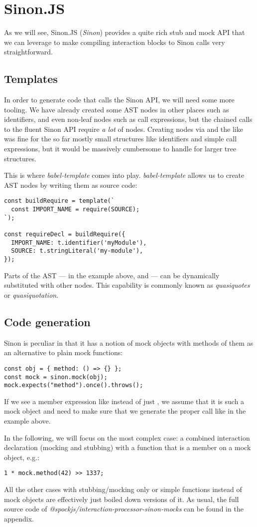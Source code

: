 \section{Sinon.JS}
As we will see,
Sinon.JS (\textit{Sinon}) provides a
quite rich stub and mock API
that we can leverage to make
compiling interaction blocks
to Sinon calls very straightforward.

\subsection{Templates}
In order to generate code that calls the Sinon API,
we will need some more tooling.
We have already created some AST nodes in other places such as identifiers,
and even non-leaf nodes such as call expressions,
but the chained calls to the fluent Sinon API
require \textit{a lot} of nodes.
Creating nodes via  and the like was fine
for the so far mostly small structures like
identifiers and simple call expressions,
but it would be massively cumbersome to handle
for larger tree structures.

This is where \textit{babel-template} comes into play.
\textit{babel-template} allows us to create AST nodes
by writing them as source code:
\autocite{BabelTemplateDoc}
\begin{verbatim}
const buildRequire = template(`
  const IMPORT_NAME = require(SOURCE);
`);

const requireDecl = buildRequire({
  IMPORT_NAME: t.identifier('myModule'),
  SOURCE: t.stringLiteral('my-module'),
});
\end{verbatim}
Parts of the AST
--- in the example above,  and  ---
can be dynamically substituted with other nodes.
This capability is commonly known as
\textit{quasiquotes} or \textit{quasiquotation}.
\autocite{LispQuasiquotation}

\subsection{Code generation}
Sinon is peculiar in that it has a notion of
mock objects with methods of them
as an alternative to plain mock functions:
\autocite{SinonMockDoc}
\begin{verbatim}
const obj = { method: () => {} };
const mock = sinon.mock(obj);
mock.expects("method").once().throws();
\end{verbatim}
If we see a member expression like
instead of just
,
we assume that it is such a mock object
and need to make sure that
we generate the proper  call
like in the example above.

In the following,
we will focus on the most complex case:
a combined interaction declaration
(mocking and stubbing) with a
function that is a member on a mock object, e.g.:
\begin{verbatim}
1 * mock.method(42) >> 1337;
\end{verbatim}
All the other cases with
stubbing/mocking only
or simple functions
instead of mock objects
are effectively just
boiled down versions of it.
As usual, the full source code of
\textit{@spockjs/interaction-processor-sinon-mocks}
can be found in the appendix.
